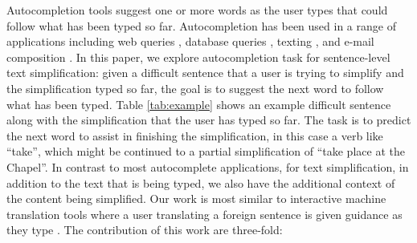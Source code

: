 \documentclass[11pt]{article}
\begin{document}
Autocompletion tools suggest one or more words as the user types that could follow what has been typed so far.  Autocompletion has been used in a range of applications including web queries \cite{cai2016survey}, database queries \cite{khoussainova2010snipsuggest}, texting \cite{dunlop2000predictive}, and e-mail composition \cite{dai2019gmail}. In this paper, we explore autocompletion task for sentence-level text simplification: given a difficult sentence that a user is trying to simplify and the simplification typed so far, the goal is to suggest the next word to follow what has been typed. Table \ref{tab:example} shows an example difficult sentence along with the simplification that the user has typed so far.  The task is to predict the next word to assist in finishing the simplification, in this case a verb like ``take'', which might be continued to a partial simplification of ``take place at the Chapel''. In contrast to most autocomplete applications, for text  simplification, in addition to the text that is being typed, we also have the additional context of the content being simplified. Our work is most similar to interactive machine translation tools where a user translating a foreign sentence is given guidance as they type \cite{green-etal-2014-human}. The contribution of this work are three-fold:

\begin{table}
    \centering
    \caption{An example text simplification autocompletion task.  The user is simplifying the difficult sentence on top and has typed the words on the bottom so far.}
    \label{tab:example}
\end{table}
\end{document}
